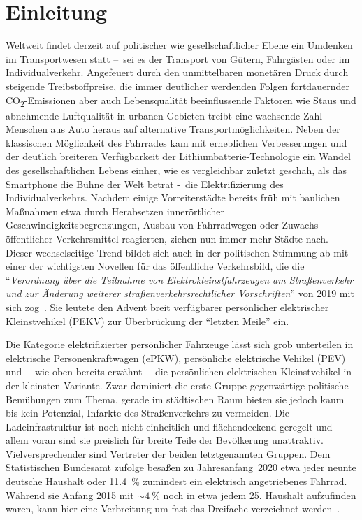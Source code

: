 \chapter{Einleitung}
%
%
%
%
	Weltweit findet derzeit auf politischer wie gesellschaftlicher Ebene ein Umdenken im Transportwesen statt --~sei es der Transport von Gütern, Fahrgästen oder im Individualverkehr.
	Angefeuert durch den unmittelbaren monetären Druck durch steigende Treibstoffpreise, die immer deutlicher werdenden Folgen fortdauernder CO\textsubscript{2}-Emissionen aber auch Lebensqualität beeinflussende Faktoren wie Staus und abnehmende Luftqualität in urbanen Gebieten treibt eine wachsende Zahl Menschen aus Auto heraus auf alternative Transportmöglichkeiten.
	Neben der klassischen Möglichkeit des Fahrrades kam mit erheblichen Verbesserungen und der deutlich breiteren Verfügbarkeit der Lithiumbatterie-Technologie ein Wandel des gesellschaftlichen Lebens einher, wie es vergleichbar zuletzt geschah, als das Smartphone die Bühne der Welt betrat -~die Elektrifizierung des Individualverkehrs.
	Nachdem einige Vorreiterstädte bereits früh mit baulichen Maßnahmen etwa durch Herabsetzen innerörtlicher Geschwindigkeitsbegrenzungen, Ausbau von Fahrradwegen oder Zuwachs öffentlicher Verkehrsmittel reagierten, ziehen nun immer mehr Städte nach.
	Dieser wechselseitige Trend bildet sich auch in der politischen Stimmung ab mit einer der wichtigsten Novellen für das öffentliche Verkehrsbild, die die ``\textit{Verordnung über die Teilnahme von Elektrokleinstfahrzeugen am Straßenverkehr und zur Änderung weiterer straßenverkehrsrechtlicher Vorschriften}'' von 2019 mit sich zog~\cite{Bundesgesetzblatt.2019}.
	Sie leutete den Advent breit verfügbarer persönlicher elektrischer Kleinstvehikel (PEKV) zur Überbrückung der ``letzten Meile'' ein.\par\medskip
	Die Kategorie elektrifizierter persönlicher Fahrzeuge lässt sich grob unterteilen in elektrische Personenkraftwagen (ePKW), persönliche elektrische Vehikel (PEV) und --~wie oben bereits erwähnt~-- die persönlichen elektrischen Kleinstvehikel in der kleinsten Variante.
	Zwar dominiert die erste Gruppe gegenwärtige politische Bemühungen zum Thema, gerade im städtischen Raum bieten sie jedoch kaum bis kein Potenzial, Infarkte des Straßenverkehrs zu vermeiden.
	Die Ladeinfrastruktur ist noch nicht einheitlich und flächendeckend geregelt und allem voran sind sie preislich für breite Teile der Bevölkerung unattraktiv.
	Vielversprechender sind Vertreter der beiden letztgenannten Gruppen.
	Dem Statistischen Bundesamt zufolge besaßen zu Jahresanfang~2020 etwa jeder neunte deutsche Haushalt oder \SI{11,4}{\percent} zumindest ein elektrisch angetriebenes Fahrrad.
	Während sie Anfang 2015 mit \(\sim \SI{4}{\percent}\) noch in etwa jedem 25. Haushalt aufzufinden waren, kann hier eine Verbreitung um fast das Dreifache verzeichnet werden~\cite{zahl.der.ebikes.StatistischesBundesamt.2020.09.28}.\par\medskip